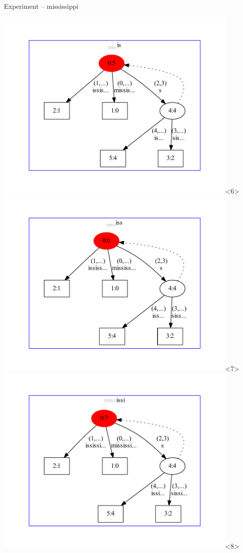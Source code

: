 \begin{frame}[shrink=13]{Experiment -- mississippi}
\begin{overlayarea}{\textwidth}{\textheight}
\includegraphics[keepaspectratio,trim=40pt 40pt 40pt 40pt,height=0.8\textheight,width=0.9\textwidth]{missis.pdf}<6>
\includegraphics[keepaspectratio,trim=40pt 40pt 40pt 40pt,height=0.8\textheight,width=0.9\textwidth]{mississ.pdf}<7>
\includegraphics[keepaspectratio,trim=40pt 40pt 40pt 40pt,height=0.8\textheight,width=0.9\textwidth]{mississi.pdf}<8>

\end{overlayarea}
\end{frame}
